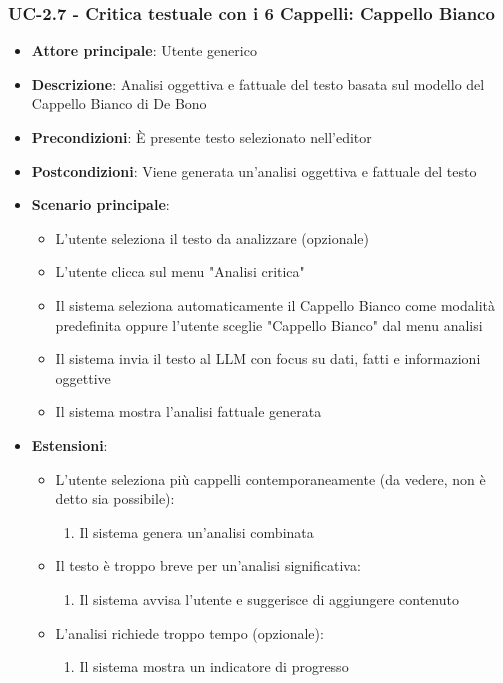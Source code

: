 \documentclass[11pt,a4paper]{article}
\begin{document}
\subsubsection{UC-2.7 - Critica testuale con i 6 Cappelli: Cappello Bianco}
\begin{itemize}
    \item \textbf{Attore principale}: Utente generico
    \item \textbf{Descrizione}: Analisi oggettiva e fattuale del testo basata sul modello del Cappello Bianco di De Bono
    \item \textbf{Precondizioni}: È presente testo selezionato nell'editor
    \item \textbf{Postcondizioni}: Viene generata un'analisi oggettiva e fattuale del testo
    \item \textbf{Scenario principale}:
        \begin{itemize}
            \item L'utente seleziona il testo da analizzare (opzionale)
            \item L'utente clicca sul menu "Analisi critica"
            \item Il sistema seleziona automaticamente il Cappello Bianco come modalità predefinita oppure l'utente sceglie "Cappello Bianco" dal menu analisi
            \item Il sistema invia il testo al LLM con focus su dati, fatti e informazioni oggettive
            \item Il sistema mostra l'analisi fattuale generata
        \end{itemize}
    \item \textbf{Estensioni}:
        \begin{itemize}
            \item L'utente seleziona più cappelli contemporaneamente (da vedere, non è detto sia possibile):
                \begin{enumerate}
                    \item Il sistema genera un'analisi combinata
                \end{enumerate}
            \item Il testo è troppo breve per un'analisi significativa:
                \begin{enumerate}
                    \item Il sistema avvisa l'utente e suggerisce di aggiungere contenuto
                \end{enumerate}
            \item L'analisi richiede troppo tempo (opzionale):
                \begin{enumerate}
                    \item Il sistema mostra un indicatore di progresso
                \end{enumerate}
        \end{itemize}
\end{itemize}
\end{document}
